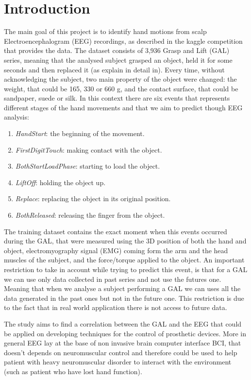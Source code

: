 \documentclass[final,leqno,onefignum,onetabnum]{siamltexmm}
\begin{document}
  \section{Introduction}
  The main goal of this project is to identify hand motions from scalp Electroencephalogram (EEG) recordings, as described in the kaggle competition that provides the data\cite{kaggle}.  The dataset consists of 3,936 Grasp and Lift (GAL) series, meaning that the analysed subject grasped an object, held it for some seconds and then replaced it (as explain in detail in\cite{experiment}). Every time, without acknowledging the subject,  two main property  of the object were changed: the  weight, that could be 165, 330 or 660 g, and the contact surface, that could be sandpaper, suede or silk. In this context there are six events that represents different stages of the hand movements and that we aim to predict though EEG analysis: 
  \begin{enumerate} 
    \item \textit{HandStart}: the beginning of the movement.
    \item \textit{FirstDigitTouch}: making contact with the object.  
    \item \textit{BothStartLoadPhase}: starting to load the object. 
    \item \textit{LiftOff}: holding the object up.
    \item \textit{Replace}: replacing the object in its original position.
    \item \textit{BothReleased}: releasing the finger from the object. 
  \end{enumerate}
  The training dataset contains the exact moment when this events occurred during the GAL, that were measured using the 3D position of both the hand and object, electromyography signal (EMG) coming form the arm and the head muscles of the subject, and the force/torque applied to the object. An important restriction to take in account while trying to predict this event, is that for a GAL we can use only data collected in past series and not use the futures one. Meaning that when we analyse a subject performing  a GAL we can uses all the data generated in the past ones but not in the future one. This restriction is due to the fact that in real world application there is not access to future data.


  The study aims to find a correlation between the GAL and the EEG  that could be applied on developing techniques for the control of prosthetic devices. More in general EEG lay at the base of non invasive brain computer interface BCI\cite{BCI}, that doesn't depends on neuromuscular control and therefore could be used to help patient with heavy neuromuscular disorder to interact with the environment (such as patient who have lost hand function). 
\end{document}
